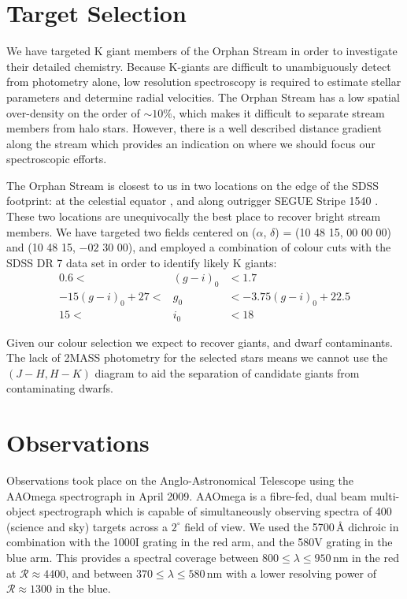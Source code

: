 \documentclass{emulateapj}
\begin{document}
\section{Target Selection}
\label{sec:target-selection}

We have targeted K giant members of the Orphan Stream in order to investigate their detailed chemistry. Because K-giants are difficult to unambiguously detect from photometry alone, low resolution spectroscopy is required to estimate stellar parameters and determine radial velocities. The Orphan Stream has a low spatial over-density on the order of $\sim10\%$, which makes it difficult to separate stream members from halo stars. However, there is a well described distance gradient along the stream \citep{Belokurov;et-al_2007, Newberg;et-al_2010} which provides an indication on where we should focus our spectroscopic efforts.

The Orphan Stream is closest to us in two locations on the edge of the SDSS footprint: at the celestial equator \citep{Belokurov;et-al_2007}, and along outrigger SEGUE Stripe 1540 \citep{Newberg;et-al_2010}. These two locations are unequivocally the best place to recover bright stream members. We have targeted two fields centered on ($\alpha$, $\delta$) = (10 48 15, 00 00 00) and (10 48 15, $-02$ 30 00), and employed a combination of colour cuts with the SDSS DR 7 \citep{Abazajian;et-al_2009} data set in order to identify likely K giants:
\begin{eqnarray}
0.6 <& (g-i)_0 &< 1.7 \\
-15(g-i)_0 + 27 <& g_0 &< -3.75(g-i)_0 + 22.5 \\
15  <& i_0  &< 18 
\end{eqnarray}

Given our colour selection we expect to recover giants, and dwarf contaminants. The lack of 2MASS photometry for the selected stars means we cannot use the $(J-H, H-K)$ diagram to aid the separation of candidate giants from contaminating dwarfs.

\section{Observations}
\label{sec:observations}

Observations took place on the Anglo-Astronomical Telescope using the AAOmega spectrograph in April 2009. AAOmega is a fibre-fed, dual beam multi-object spectrograph which is capable of simultaneously observing spectra of 400 (science and sky) targets across a $2^\circ$ field of view. We used the 5700\,{\AA} dichroic in combination with the 1000I grating in the red arm, and the 580V grating in the blue arm. This provides a spectral coverage between $800 \leq \lambda \leq 950$\,nm in the red at $\mathcal{R} \approx 4400$, and between $370 \leq \lambda \leq 580$\,nm with a lower resolving power of $\mathcal{R} \approx 1300$ in the blue.
\end{document}
